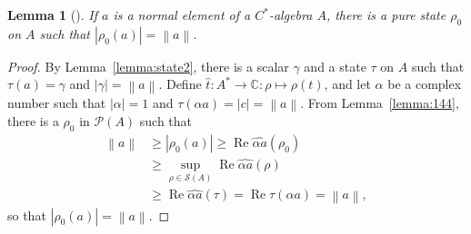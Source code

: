 \documentclass[11pt,a4paper]{report}
\theoremstyle{plain}
\newtheorem{lemma}{Lemma}
\theoremstyle{definition}
\newcommand{\1}{\mathbbm{1}}
\newcommand{\C}{\mathbb{C}}
\renewcommand{\S}{\mathscr{S}}
\renewcommand{\P}[1]{\mathscr{P}(#1)}
\DeclareMathOperator{\Real}{\operatorname{Re}}
\begin{document}
\begin{lemma}[{\cite[4.3.8,(iv)]{kadison83}}]\label{lemma:pure2}
	If $a$ is a normal element of a $C^\ast$-algebra $A$, there is a pure state 
	$\rho_0$ on $A$ such that $|\rho_0(a)|=\left\|a\right\|$.
\end{lemma}
\begin{proof}
	By Lemma~\ref{lemma:state2}, there is a scalar $\gamma$ and a state $\tau$ on 
	$A$ such that $\tau(a)=\gamma$ and $|\gamma|=\left\|a\right\|$. Define $\hat t 
	:A^\ast\to\C:\rho \mapsto\rho(t)$, and let $\alpha$ be a complex number such 
	that $|\alpha|=1$ and $\tau(\alpha a) = |c| = \left\|a\right\|$. From 
	Lemma~\ref{lemma:144}, there is a $\rho_0$ in $\P A$ such that 
	\begin{align*}
				\left\|a\right\|
		&\geq 	|\rho_0(a)| \geq \Real \widehat {\alpha a}(\rho_0)							\\
		&\geq 	\sup_{\rho\in \S(A)} \Real\widehat {\alpha a}(\rho) 						\\
		&\geq	\Real\widehat {\alpha a}(\tau) 
				= \Real\tau(\alpha a) = \left\|a\right\|,
	\end{align*}
	so that $|\rho_0(a)|=\left\|a\right\|$.
\end{proof}
\end{document}
